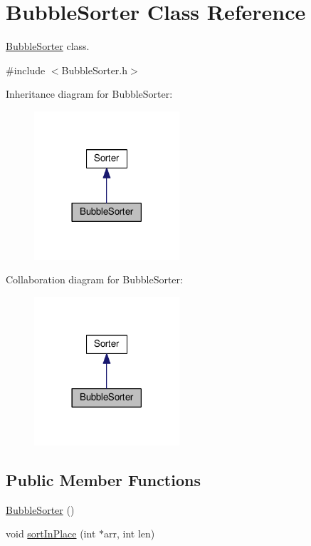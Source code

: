 \hypertarget{class_bubble_sorter}{}\section{Bubble\+Sorter Class Reference}
\label{class_bubble_sorter}


\hyperlink{class_bubble_sorter}{Bubble\+Sorter} class.  




{\ttfamily \#include $<$Bubble\+Sorter.\+h$>$}



Inheritance diagram for Bubble\+Sorter\+:\nopagebreak
\begin{figure}[H]
\begin{center}
\leavevmode
\includegraphics[width=153pt]{class_bubble_sorter__inherit__graph}
\end{center}
\end{figure}


Collaboration diagram for Bubble\+Sorter\+:\nopagebreak
\begin{figure}[H]
\begin{center}
\leavevmode
\includegraphics[width=153pt]{class_bubble_sorter__coll__graph}
\end{center}
\end{figure}
\subsection*{Public Member Functions}
\begin{DoxyCompactItemize}
\item 
\hyperlink{class_bubble_sorter_a1f4d62f7f9c513a7d3e08966b0a0670c}{Bubble\+Sorter} ()
\item 
void \hyperlink{class_bubble_sorter_ab430d94d65daffbe7ccc9e747e05b653}{sort\+In\+Place} (int $\ast$arr, int len)
\end{DoxyCompactItemize}
